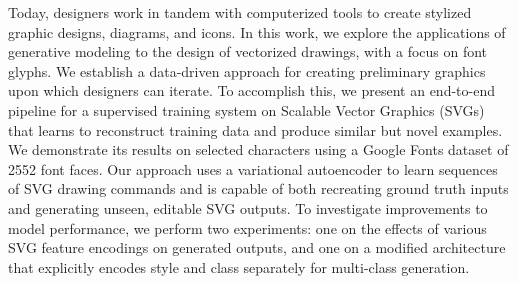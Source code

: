 Today, designers work in tandem with computerized tools to create stylized graphic designs, diagrams, and icons.
In this work, we explore the applications of generative modeling to the design of vectorized drawings, with a focus on font glyphs.
We establish a data-driven approach for creating preliminary graphics upon which designers can iterate.
To accomplish this, we present an end-to-end pipeline for a supervised training system on Scalable Vector Graphics (SVGs) that learns to reconstruct training data and produce similar but novel examples.
We demonstrate its results on selected characters using a Google Fonts dataset of 2552 font faces.
Our approach uses a variational autoencoder to learn sequences of SVG drawing commands and is capable of both recreating ground truth inputs and generating unseen, editable SVG outputs.
To investigate improvements to model performance, we perform two experiments: one on the effects of various SVG feature encodings on generated outputs, and one on a modified architecture that explicitly encodes style and class separately for multi-class generation.
